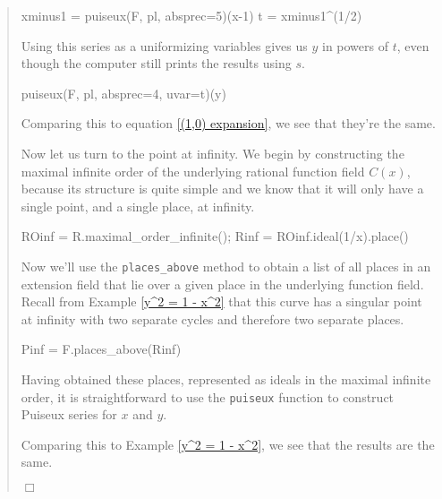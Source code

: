 \begin{examplecont}
\begin{quote}
\begin{sageblock}[ch7]
xminus1 = puiseux(F, pl, absprec=5)(x-1)
t = xminus1^(1/2)
\end{sageblock}

Using this series as a uniformizing variables gives us $y$ in powers of $t$,
even though the computer still prints the results using $s$.

\begin{sageblock}[ch7]
puiseux(F, pl, absprec=4, uvar=t)(y)
\end{sageblock}

Comparing this to equation \ref{(1,0) expansion}, we see that they're the same.

Now let us turn to the point at infinity.  We begin by constructing the
maximal infinite order of the underlying rational function field $C(x)$,
because its structure is quite simple and we know that it will only have a single point,
and a single place, at infinity.

\begin{sageblock}[ch7]
ROinf = R.maximal_order_infinite();
Rinf = ROinf.ideal(1/x).place()
\end{sageblock}

Now we'll use the {\tt places\_above} method
to obtain a list of all places in an extension field that lie
over a given place in the underlying function field.
Recall from Example \ref{y^2 = 1 - x^2} that this curve has a
singular point at infinity with two separate cycles
and therefore two separate places.

\begin{sageblock}[ch7]
Pinf = F.places_above(Rinf)
\end{sageblock}

Having obtained
these places, represented as ideals in the maximal infinite order,
it is straightforward to use the {\tt puiseux} function
to construct Puiseux series for $x$ and $y$.

\begin{sageblock}[ch7]
[puiseux(F, pl, absprec=5)(x) for pl in Pinf]
[puiseux(F, pl, absprec=5)(y) for pl in Pinf]
\end{sageblock}

Comparing this to Example \ref{y^2 = 1 - x^2}, we see that the results are the same.

\hfill$\Box$\end{quote}
\end{examplecont}


